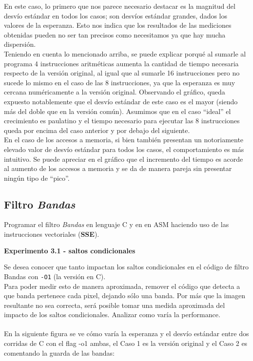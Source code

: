 En este caso, lo primero que nos parece necesario destacar es la magnitud del desv\'io est\'andar en todos los casos; son desv\'ios est\'andar grandes, dados los valores de la esperanza. Esto nos indica que los resultados de las mediciones obtenidas pueden no ser tan precisos como necesitamos ya que hay mucha dispersi\'on.\\

Teniendo en cuenta lo mencionado arriba, se puede explicar porqu\'e al sumarle al programa 4 instrucciones aritm\'eticas aumenta la cantidad de tiempo necesaria respecto de la versi\'on original, al igual que al sumarle 16 instrucciones pero no sucede lo mismo en el caso de las 8 instrucciones, ya que la esperanza es muy cercana num\'ericamente a la versi\'on original. Observando el gr\'afico, queda expuesto notablemente que el desv\'io est\'andar de este caso es el mayor (siendo m\'as del doble que en la versi\'on com\'un). Asumimos que en el caso ``ideal'' el crecimiento es paulatino y el tiempo necesario para ejecutar las 8 instrucciones queda por encima del caso anterior y por debajo del siguiente.\\

En el caso de los accesos a memoria, si bien tambi\'en presentan un notoriamente elevado valor de desv\'io est\'andar para todos los casos, el comportamiento es m\'as intuitivo. Se puede apreciar en el gr\'afico que el incremento del tiempo es acorde al aumento de los accesos a memoria y se da de manera pareja sin presentar ning\'un tipo de ``pico''.


\newpage

\subsection{Filtro \textit{Bandas}}

Programar el filtro \textit{Bandas} en lenguaje C y en en ASM haciendo uso de 
las instrucciones vectoriales (\textbf{SSE}).

\vspace*{0.3cm} \noindent
\textbf{Experimento 3.1 - saltos condicionales}

Se desea conocer que tanto impactan los saltos condicionales en el código 
de filtro Bandas con \verb|-O1| (la versión en C).\\
Para poder medir esto de manera aproximada, remover el código
que detecta a que banda pertenece cada pixel, dejando
sólo una banda.
Por más que la imagen resultante no sea correcta, será posible tomar una
medida aproximada del impacto de los saltos condicionales.
Analizar como varía la performance. \\
\\
En la siguiente figura se ve c\'omo var\'ia la esperanza y el desv\'io est\'andar entre dos corridas de C con el flag -o1 ambas, el Caso 1 es la versión original y el Caso 2 es comentando la guarda de las bandas:

